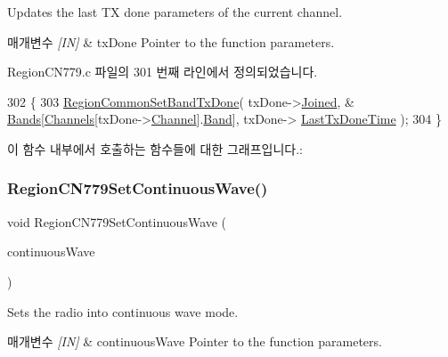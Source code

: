 Updates the last TX done parameters of the current channel. 


\begin{DoxyParams}{매개변수}
{\em \mbox{[}\+I\+N\mbox{]}} & tx\+Done Pointer to the function parameters. \\
\hline
\end{DoxyParams}


Region\+C\+N779.\+c 파일의 301 번째 라인에서 정의되었습니다.


\begin{DoxyCode}
302 \{
303     \mbox{\hyperlink{group___r_e_g_i_o_n_c_o_m_m_o_n_ga491dea5590228a0cd33affd71743779c}{RegionCommonSetBandTxDone}}( txDone->\mbox{\hyperlink{structs_set_band_tx_done_params_ac2f6caa0f3b02d2ac5056c3ee7c22652}{Joined}}, &
      \mbox{\hyperlink{_region_c_n779_8c_af0fa082231b29a5cac086386277e6ecc}{Bands}}[\mbox{\hyperlink{_region_c_n779_8c_ad43b16563c3a87159ec34d1db860a3da}{Channels}}[txDone->\mbox{\hyperlink{structs_set_band_tx_done_params_a1ca6f01ca18afe402de51babe8c95f5e}{Channel}}].\mbox{\hyperlink{structs_channel_params_a724c03aa06953111c3291243831f251b}{Band}}], txDone->
      \mbox{\hyperlink{structs_set_band_tx_done_params_a7316dfb002c4e0015fceeb727020fe5c}{LastTxDoneTime}} );
304 \}
\end{DoxyCode}
이 함수 내부에서 호출하는 함수들에 대한 그래프입니다.\+:
\mbox{\label{group___r_e_g_i_o_n_c_n779_ga702d0d0348fdbcb2b66f7e9d5fb93a61}} 
\subsubsection{\texorpdfstring{Region\+C\+N779\+Set\+Continuous\+Wave()}{RegionCN779SetContinuousWave()}}
{\footnotesize\ttfamily void Region\+C\+N779\+Set\+Continuous\+Wave (\begin{DoxyParamCaption}\item[{\mbox{\hyperlink{group___r_e_g_i_o_n_gaf39bb5ba06921139c6d17f88a8d518cd}{Continuous\+Wave\+Params\+\_\+t}} $\ast$}]{continuous\+Wave }\end{DoxyParamCaption})}



Sets the radio into continuous wave mode. 


\begin{DoxyParams}{매개변수}
{\em \mbox{[}\+I\+N\mbox{]}} & continuous\+Wave Pointer to the function parameters. \\
\hline
\end{DoxyParams}


